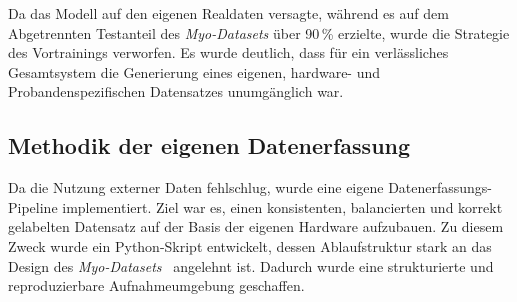     Da das Modell auf den eigenen Realdaten versagte, während es auf dem Abgetrennten Testanteil des \textit{Myo-Datasets} über 90\,\% erzielte, wurde die Strategie des Vortrainings verworfen. Es wurde deutlich, dass für ein verlässliches Gesamtsystem die Generierung eines eigenen, hardware- und Probandenspezifischen Datensatzes unumgänglich war.

    \subsection{Methodik der eigenen Datenerfassung}
    \label{subsec:data_acquisition}
    Da die Nutzung externer Daten fehlschlug, wurde eine eigene Datenerfassungs-Pipeline implementiert. Ziel war es, einen konsistenten, balancierten und korrekt gelabelten Datensatz auf der Basis der eigenen Hardware aufzubauen. Zu diesem Zweck wurde ein Python-Skript entwickelt, dessen Ablaufstruktur stark an das Design des \textit{Myo-Datasets}~\cite{myo_dataset} angelehnt ist. Dadurch wurde eine strukturierte und reproduzierbare Aufnahmeumgebung geschaffen.

